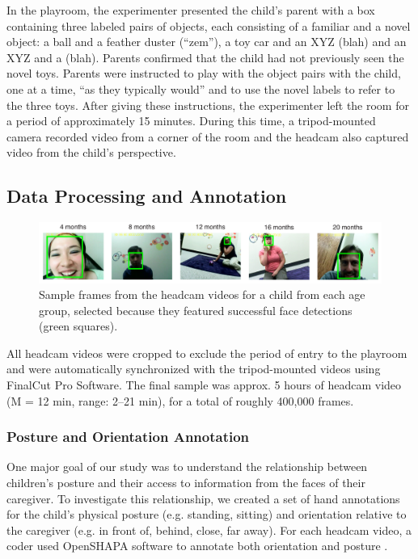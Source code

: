 \documentclass[10pt,letterpaper]{article}
\begin{document}
In the playroom, the experimenter presented the child's parent with a box containing three labeled pairs of objects, each consisting of a familiar and a novel object: a ball and a feather duster (``zem''), a toy car and an XYZ (blah) and an XYZ and a (blah). Parents confirmed that the child had not previously seen the novel toys. Parents were instructed to play with the object pairs with the child, one at a time, ``as they typically would'' and to use the novel labels to refer to the three toys. After giving these instructions, the experimenter left the room for a period of approximately 15 minutes. During this time, a tripod-mounted camera recorded video from a corner of the room and the headcam also captured video from the child's perspective. 

\subsection{Data Processing and Annotation}

\begin{figure}
\includegraphics[width=7in]{figures/framesample.pdf}
\caption{\label{fig:frames} Sample frames from the headcam videos for a child from each age group, selected because they featured successful face detections (green squares).} 
\end{figure}

All headcam videos were cropped to exclude the period of entry to the playroom and were automatically synchronized with the tripod-mounted videos using FinalCut Pro Software. The final sample was approx. 5 hours of headcam video (M = 12 min, range: 2--21 min), for a total of roughly 400,000 frames. 

\subsubsection{Posture and Orientation Annotation}

One major goal of our study was to understand the relationship between children's posture and their access to information from the faces of their caregiver. To investigate this relationship, we created a set of hand annotations for the child's physical posture (e.g. standing, sitting) and orientation relative to the caregiver (e.g. in front of, behind, close, far away). For each headcam video, a coder used OpenSHAPA software to annotate both orientation and posture \cite{adolph2012}. 
\end{document}
